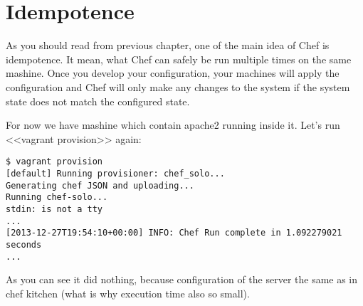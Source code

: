 \section{Idempotence}

As you should read from previous chapter, one of the main idea of Chef is idempotence. It mean, what Chef can safely be run multiple times on the same mashine. Once you develop your configuration, your machines will apply the configuration and Chef will only make any changes to the system if the system state does not match the configured state.

For now we have mashine which contain apache2 running inside it. Let's run <<vagrant provision>> again:

\begin{lstlisting}[label=lst:my-cloud-idempotence1,title=my-cloud/nodes/Vagrantfile]
$ vagrant provision
[default] Running provisioner: chef_solo...
Generating chef JSON and uploading...
Running chef-solo...
stdin: is not a tty
...
[2013-12-27T19:54:10+00:00] INFO: Chef Run complete in 1.092279021 seconds
...
\end{lstlisting}

As you can see it did nothing, because configuration of the server the same as in chef kitchen (what is why execution time also so small).
